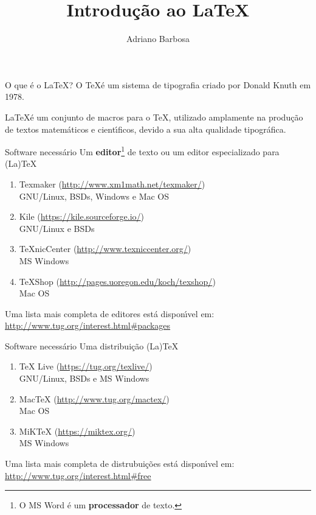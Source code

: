 \documentclass{beamer}
\author{Adriano Barbosa}
\title{Introdu\c{c}\~ao ao \LaTeX}
\begin{document}
\begin{frame}
	\maketitle
\end{frame}

\begin{frame}{O que \'e o \LaTeX?}
    O \TeX \'e um sistema de tipografia criado por Donald Knuth em 1978.

    \vspace{1cm}
    \pause
    
    \LaTeX \'e um conjunto de macros para o \TeX, utilizado amplamente na
    produ\c{c}\~ao de textos matem\'aticos e cient\'{\i}ficos, devido a sua alta qualidade
    tipogr\'afica.
\end{frame}

\begin{frame}[fragile]{Software necess\'ario}
    Um \textbf{editor}\footnote{O MS Word \'e um \textbf{processador} de texto.} de
    texto ou um editor especializado para (La)TeX
        \begin{enumerate}
            \item Texmaker (\url{http://www.xm1math.net/texmaker/}) \\ GNU/Linux, BSDs, Windows e Mac OS
            \item Kile (\url{https://kile.sourceforge.io/})\\ GNU/Linux e BSDs
            \item TeXnicCenter (\url{http://www.texniccenter.org/})\\ MS Windows
            \item TeXShop (\url{http://pages.uoregon.edu/koch/texshop/})\\ Mac OS
        \end{enumerate}

    \vspace{1cm}
    Uma lista mais completa de editores est\'a dispon\'{\i}vel em:
    \url{http://www.tug.org/interest.html#packages}
\end{frame}

\begin{frame}[fragile]{Software necess\'ario}
    Uma distribui\c{c}\~ao (La)TeX
        \begin{enumerate}
            \item TeX Live (\url{https://tug.org/texlive/})\\ GNU/Linux, BSDs e MS Windows
            \item MacTeX (\url{http://www.tug.org/mactex/})\\ Mac OS
            \item MiKTeX (\url{https://miktex.org/})\\ MS Windows
        \end{enumerate}

    \vspace{1cm}
    Uma lista mais completa de distrubui\c{c}\~oes est\'a dispon\'{\i}vel em:
    \url{http://www.tug.org/interest.html#free}
\end{frame}
\end{document}
